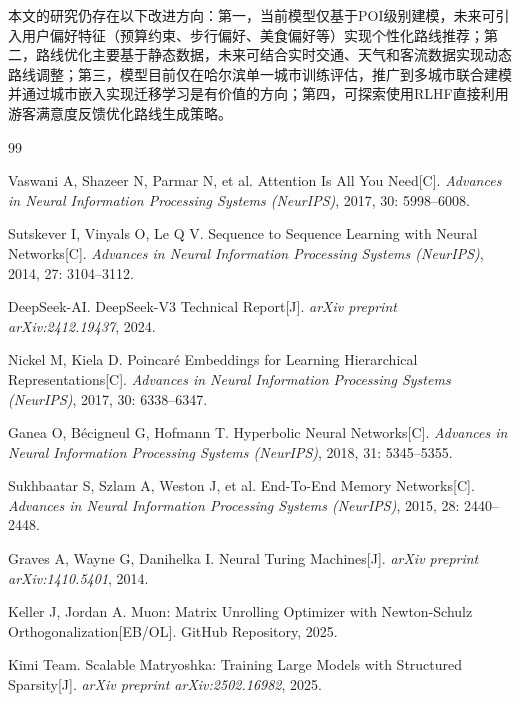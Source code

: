 \documentclass[12pt,a4paper]{ctexart}
\begin{document}
本文的研究仍存在以下改进方向：第一，当前模型仅基于POI级别建模，未来可引入用户偏好特征（预算约束、步行偏好、美食偏好等）实现个性化路线推荐；第二，路线优化主要基于静态数据，未来可结合实时交通、天气和客流数据实现动态路线调整；第三，模型目前仅在哈尔滨单一城市训练评估，推广到多城市联合建模并通过城市嵌入实现迁移学习是有价值的方向；第四，可探索使用RLHF直接利用游客满意度反馈优化路线生成策略。

\newpage

\renewcommand{\refname}{\centering\heiti\fontsize{14pt}{24pt}\selectfont 参考文献}

\begin{thebibliography}{99}
\songti\fontsize{10.5pt}{24pt}\selectfont
\setlength{\parskip}{0pt}
\setlength{\itemsep}{0pt plus 1pt}

 Vaswani A, Shazeer N, Parmar N, et al. Attention Is All You Need[C]. \textit{Advances in Neural Information Processing Systems (NeurIPS)}, 2017, 30: 5998--6008.

 Sutskever I, Vinyals O, Le Q V. Sequence to Sequence Learning with Neural Networks[C]. \textit{Advances in Neural Information Processing Systems (NeurIPS)}, 2014, 27: 3104--3112.

 DeepSeek-AI. DeepSeek-V3 Technical Report[J]. \textit{arXiv preprint arXiv:2412.19437}, 2024.

 Nickel M, Kiela D. Poincar\'{e} Embeddings for Learning Hierarchical Representations[C]. \textit{Advances in Neural Information Processing Systems (NeurIPS)}, 2017, 30: 6338--6347.

 Ganea O, B\'{e}cigneul G, Hofmann T. Hyperbolic Neural Networks[C]. \textit{Advances in Neural Information Processing Systems (NeurIPS)}, 2018, 31: 5345--5355.

 Sukhbaatar S, Szlam A, Weston J, et al. End-To-End Memory Networks[C]. \textit{Advances in Neural Information Processing Systems (NeurIPS)}, 2015, 28: 2440--2448.

 Graves A, Wayne G, Danihelka I. Neural Turing Machines[J]. \textit{arXiv preprint arXiv:1410.5401}, 2014.

 Keller J, Jordan A. Muon: Matrix Unrolling Optimizer with Newton-Schulz Orthogonalization[EB/OL]. GitHub Repository, 2025.

 Kimi Team. Scalable Matryoshka: Training Large Models with Structured Sparsity[J]. \textit{arXiv preprint arXiv:2502.16982}, 2025.


\end{thebibliography}
\end{document}
